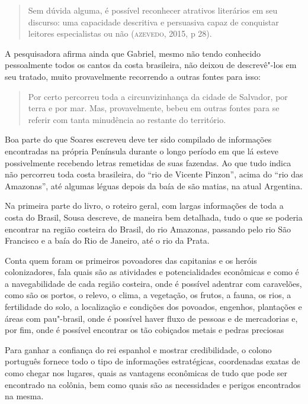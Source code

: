 \documentclass[12pt]{extarticle}
\begin{document}
\begin{quote}
Sem dúvida alguma, é possível reconhecer atrativos literários em seu
discurso: uma capacidade descritiva e persuasiva capaz de conquistar
leitores especialistas ou não (\textsc{azevedo}, 2015, p 28).
\end{quote}

A pesquisadora afirma ainda que Gabriel, mesmo não tendo conhecido
pessoalmente todos os cantos da costa brasileira, não deixou de
descrevê"-los em seu tratado, muito provavelmente recorrendo a outras
fontes para isso:

\begin{quote}
Por certo percorreu toda a circunvizinhança da cidade de Salvador, por
terra e por mar. Mas, provavelmente, bebeu em outras fontes para se
referir com tanta minudência ao restante do território.
\end{quote}

Boa parte do que Soares escreveu deve ter sido compilado de informações
encontradas na própria Península durante o longo período em que lá
esteve possivelmente recebendo letras remetidas de suas fazendas. Ao que
tudo indica não percorreu toda costa brasileira, do ``rio de Vicente
Pinzon'', acima do ``rio das Amazonas'', até algumas léguas depois da
baía de são matias, na atual Argentina.

Na primeira parte do livro, o roteiro geral, com largas informações de
toda a costa do Brasil, Sousa descreve, de maneira bem detalhada, tudo o
que se poderia encontrar na região costeira do Brasil, do rio Amazonas,
passando pelo rio São Francisco e a baía do Rio de Janeiro, até o rio da
Prata.

Conta quem foram os primeiros povoadores das capitanias e os heróis
colonizadores, fala quais são as atividades e potencialidades econômicas
e como é a navegabilidade de cada região costeira, onde é possível
adentrar com caravelões, como são os portos, o relevo, o clima, a
vegetação, os frutos, a fauna, os rios, a fertilidade do solo, a
localização e condições dos povoados, engenhos, plantações e áreas com
pau"-brasil, onde é possível haver fluxo de pessoas e de mercadorias e,
por fim, onde é possível encontrar os tão cobiçados metais e pedras
preciosas

Para ganhar a confiança do rei espanhol e mostrar credibilidade, o
colono português fornece todo o tipo de informações estratégicas,
coordenadas exatas de como chegar nos lugares, quais as vantagens
econômicas de tudo que pode ser encontrado na colônia, bem como quais
são as necessidades e perigos encontrados na mesma.
\end{document}
